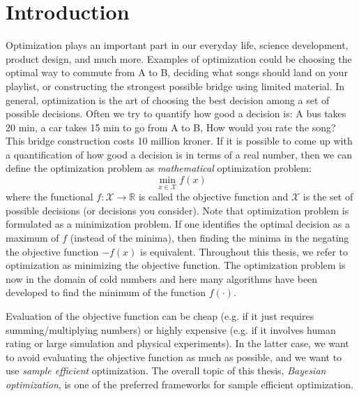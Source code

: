 \chapter{Introduction}

Optimization plays an important part in our everyday life, science development, product design, and
much more. Examples of optimization could be choosing the optimal way to commute from A to B,
deciding what songs should land on your playlist, or constructing the strongest possible bridge using
limited material. In general, optimization is the art of choosing the best decision among a set of possible
decisions. Often we try to quantify how good a decision is: A bus takes 20 min, a car takes 15 min to go from A to B, How would
you rate the song? This bridge construction costs 10 million kroner. If it is possible to come up with a
quantification of how good a decision is in terms of a real number, then we can define the optimization problem as
\textit{mathematical} optimization problem: 
$$\min_{x\in \mathcal{X}} f(x)$$ where the functional $f: \mathcal{X} \rightarrow \mathbb{R}$ is
called the objective function and $\mathcal{X}$ is the set of possible decisions (or decisions you
consider). Note that optimization problem is formulated as a minimization problem. If one identifies
the optimal decision as a maximum of $f$ (instead of the minima), then finding the minima in the
negating the objective function $-f(x)$ is equivalent. Throughout this thesis, we refer to
optimization as minimizing the objective function. The optimization problem is now in the domain of
cold numbers and here many algorithms have been developed to find the minimum of the function
$f(\cdot)$.

Evaluation of the objective function can be cheap (e.g. if it just requires summing/multiplying
numbers) or highly expensive (e.g. if it involves human rating or large simulation and physical
experiments). In the latter case, we want to avoid evaluating the objective function as much as
possible, and we want to use \textit{sample efficient} optimization. The overall topic of this
thesis, \textit{Bayesian optimization}, is one of the preferred frameworks for sample efficient optimization. 

